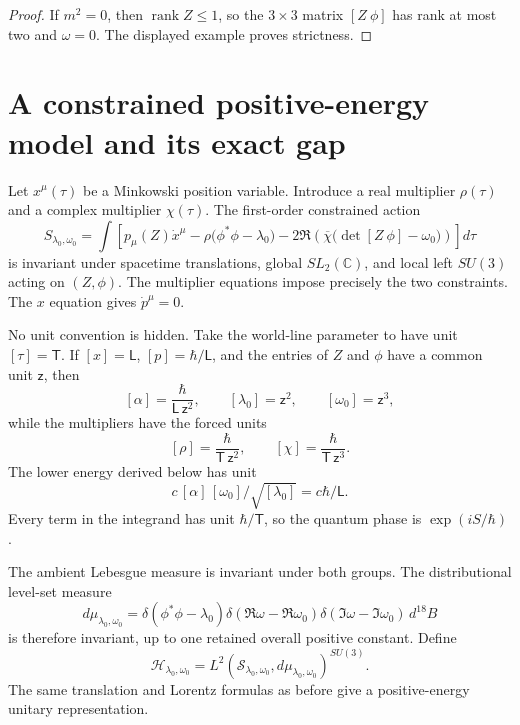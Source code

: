 \documentclass[11pt]{article}
\theoremstyle{definition}
\newcommand{\C}{\mathbb C}
\newcommand{\rank}{\operatorname{rank}}
\newcommand{\cH}{\mathscr H}
\newcommand{\cS}{\mathscr S}
\begin{document}
\begin{proof}
If $m^2=0$, then $\rank Z\leq1$, so the $3\times3$ matrix $[Z\ \phi]$ has rank at most two and $\omega=0$.  The displayed example proves strictness.
\end{proof}

\section{A constrained positive-energy model and its exact gap}

Let $x^\mu(\tau)$ be a Minkowski position variable.  Introduce a real multiplier $\rho(\tau)$ and a complex multiplier $\chi(\tau)$.  The first-order constrained action
\[
 \boxed{
 S_{\lambda_0,\omega_0}
 =\int\left[
 p_\mu(Z)\dot x^\mu
 -\rho\bigl(\phi^*\phi-\lambda_0\bigr)
 -2\Re\!\left(\overline\chi
 \bigl(\det[Z\ \phi]-\omega_0\bigr)\right)
 \right]d\tau}
\]
is invariant under spacetime translations, global $SL_2(\C)$, and local left $SU(3)$ acting on $(Z,\phi)$.  The multiplier equations impose precisely the two constraints.  The $x$ equation gives $\dot p^\mu=0$.

No unit convention is hidden.  Take the world-line parameter to have unit
$[\tau]=\mathsf T$.  If $[x]=\mathsf L$, $[p]=\hbar/\mathsf L$, and the entries of $Z$ and $\phi$ have a common unit $\mathsf z$, then
\[
 [\alpha]=\frac{\hbar}{\mathsf L\,\mathsf z^2},
 \qquad
 [\lambda_0]=\mathsf z^2,
 \qquad
 [\omega_0]=\mathsf z^3,
\]
while the multipliers have the forced units
\[
 [\rho]=\frac{\hbar}{\mathsf T\,\mathsf z^2},
 \qquad
 [\chi]=\frac{\hbar}{\mathsf T\,\mathsf z^3}.
\]
The lower energy derived below has unit
\[
 c\,[\alpha]\,[\omega_0]/\sqrt{[\lambda_0]}
 =c\hbar/\mathsf L.
\]
Every term in the integrand has unit $\hbar/\mathsf T$, so the quantum phase is $\exp(iS/\hbar)$.

The ambient Lebesgue measure is invariant under both groups.  The distributional level-set measure
\[
 d\mu_{\lambda_0,\omega_0}
 =\delta(\phi^*\phi-\lambda_0)
  \delta(\Re\omega-\Re\omega_0)
  \delta(\Im\omega-\Im\omega_0)\,d^{18}B
\]
is therefore invariant, up to one retained overall positive constant.  Define
\[
 \cH_{\lambda_0,\omega_0}
 =L^2(\cS_{\lambda_0,\omega_0},d\mu_{\lambda_0,\omega_0})^{SU(3)}.
\]
The same translation and Lorentz formulas as before give a positive-energy unitary representation.
\end{document}

